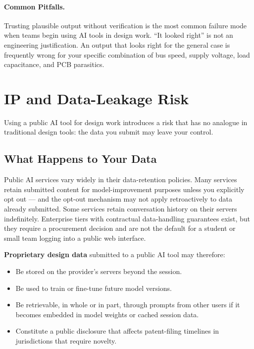 \paragraph{Common Pitfalls.}
Trusting plausible output without verification is the most common failure mode
when teams begin using AI tools in design work.
``It looked right'' is not an engineering justification.
An output that looks right for the general case is frequently wrong for your
specific combination of bus speed, supply voltage, load capacitance, and PCB
parasitics.

\section{IP and Data-Leakage Risk}
\label{sec:ch8-ip}

Using a public AI tool for design work introduces a risk that has no analogue
in traditional design tools: the data you submit may leave your control.

\subsection{What Happens to Your Data}
\label{sec:ch8-ip-data}

Public AI services vary widely in their data-retention policies.
Many services retain submitted content for model-improvement purposes unless
you explicitly opt out --- and the opt-out mechanism may not apply retroactively
to data already submitted.
Some services retain conversation history on their servers indefinitely.
Enterprise tiers with contractual data-handling guarantees exist, but they
require a procurement decision and are not the default for a student or small
team logging into a public web interface.

\textbf{Proprietary design data} submitted to a
public AI tool may therefore:
\begin{itemize}
  \item Be stored on the provider's servers beyond the session.
  \item Be used to train or fine-tune future model versions.
  \item Be retrievable, in whole or in part, through prompts from other users
        if it becomes embedded in model weights or cached session data.
  \item Constitute a public disclosure that affects patent-filing timelines in
        jurisdictions that require novelty.
\end{itemize}


